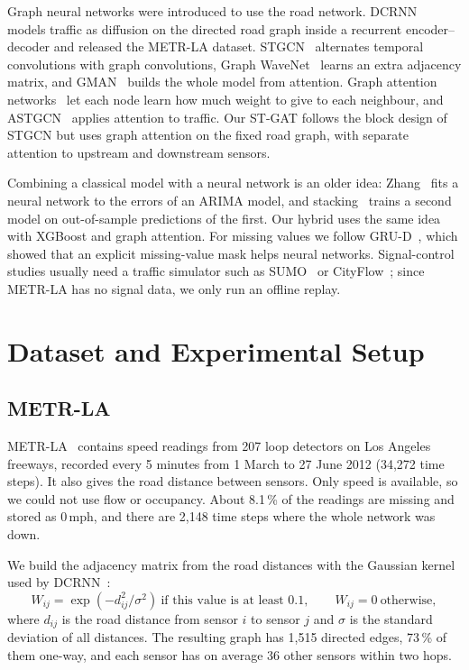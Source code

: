 \documentclass[11pt,a4paper]{article}
\begin{document}
Graph neural networks were introduced to use the road network. DCRNN~\cite{li2018dcrnn} models
traffic as diffusion on the directed road graph inside a recurrent encoder--decoder and released
the METR-LA dataset. STGCN~\cite{yu2018stgcn} alternates temporal convolutions with graph
convolutions, Graph WaveNet~\cite{wu2019gwnet} learns an extra adjacency matrix, and
GMAN~\cite{zheng2020gman} builds the whole model from attention. Graph attention
networks~\cite{velickovic2018gat} let each node learn how much weight to give to each neighbour,
and ASTGCN~\cite{guo2019astgcn} applies attention to traffic. Our ST-GAT follows the block design
of STGCN but uses graph attention on the fixed road graph, with separate attention to upstream
and downstream sensors.

Combining a classical model with a neural network is an older idea: Zhang~\cite{zhang2003hybrid}
fits a neural network to the errors of an ARIMA model, and stacking~\cite{wolpert1992stacking}
trains a second model on out-of-sample predictions of the first. Our hybrid uses the same idea
with XGBoost and graph attention. For missing values we follow GRU-D~\cite{che2018grud}, which
showed that an explicit missing-value mask helps neural networks. Signal-control studies usually
need a traffic simulator such as SUMO~\cite{krajzewicz2012sumo} or
CityFlow~\cite{zhang2019cityflow}; since METR-LA has no signal data, we only run an offline
replay.

\section{Dataset and Experimental Setup}
\subsection{METR-LA}
METR-LA~\cite{li2018dcrnn} contains speed readings from 207 loop detectors on Los Angeles
freeways, recorded every 5 minutes from 1 March to 27 June 2012 (34,272 time steps). It also
gives the road distance between sensors. Only speed is available, so we could not use flow or
occupancy. About 8.1\,\% of the readings are missing and stored as 0\,mph, and there are 2,148
time steps where the whole network was down.

We build the adjacency matrix from the road distances with the Gaussian kernel used by
DCRNN~\cite{li2018dcrnn}:
\begin{equation}
W_{ij}=\exp\!\left(-d_{ij}^2/\sigma^2\right)\ \text{if this value is at least } 0.1,\qquad W_{ij}=0\ \text{otherwise},
\end{equation}
where $d_{ij}$ is the road distance from sensor $i$ to sensor $j$ and $\sigma$ is the standard
deviation of all distances. The resulting graph has 1,515 directed edges, 73\,\% of them
one-way, and each sensor has on average 36 other sensors within two hops.
\end{document}
